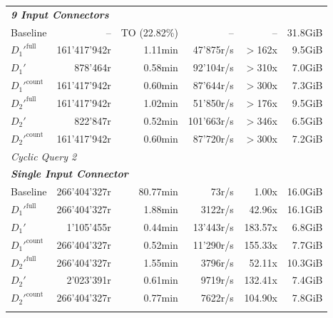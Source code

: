 \begin{longtable}{lrrrrr}
    \multicolumn{6}{l}{\textit{\textbf{9 Input Connectors}}} \\
    \nopagebreak
    Baseline              &  --                   &  TO (22.82\%)       &  --                  & --                & 31.8GiB   \\
    $D_1'^{\text{full}}$   &  161'417'942r         &  1.11min            &  47'875r/s           & $>$162x           & 9.5GiB    \\
    \quad $D_1'$           &  878'464r             &  0.58min            &  92'104r/s           & $>$310x           & 7.0GiB    \\
    $D_1'^{\text{count}}$  &  161'417'942r         &  0.60min            &  87'644r/s           & $>$300x           & 7.3GiB    \\
    $D_2'^{\text{full}}$   &  161'417'942r         &  1.02min            &  51'850r/s           & $>$176x           & 9.5GiB    \\
    \quad $D_2'$           &  822'847r             &  0.52min            &  101'663r/s          & $>$346x           & 6.5GiB    \\
    $D_2'^{\text{count}}$  &  161'417'942r         &  0.60min            &  87'720r/s           & $>$300x           & 7.2GiB    \\
    \midrule


    \multicolumn{6}{l}{\textit{Cyclic Query 2}} \\
    \midrule
    \multicolumn{6}{l}{\textit{\textbf{Single Input Connector}}} \\
    \nopagebreak
    Baseline              &  266'404'327r         &  80.77min           &  73r/s               & 1.00x             & 16.0GiB   \\
    $D_1'^{\text{full}}$   &  266'404'327r         &  1.88min            &  3122r/s             & 42.96x            & 16.1GiB   \\
    \quad $D_1'$           &  1'105'455r           &  0.44min            &  13'443r/s           & 183.57x           & 6.8GiB    \\
    $D_1'^{\text{count}}$  &  266'404'327r         &  0.52min            &  11'290r/s           & 155.33x           & 7.7GiB    \\
    $D_2'^{\text{full}}$   &  266'404'327r         &  1.55min            &  3796r/s             & 52.11x            & 10.3GiB   \\
    \quad $D_2'$           &  2'023'391r           &  0.61min            &  9719r/s             & 132.41x           & 7.4GiB    \\
    $D_2'^{\text{count}}$  &  266'404'327r         &  0.77min            &  7622r/s             & 104.90x           & 7.8GiB    \\
    \addlinespace
    

\end{longtable}
